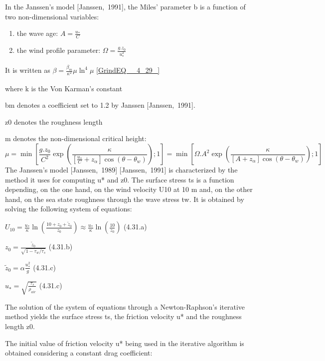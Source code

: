  In the Janssen's model [Janssen,~1991], the Miles' parameter b is a function of two non-dimensional variables:

\begin{enumerate}
\item  the wave age:  $A=\frac{u_{*} }{C} $

\item  the wind profile parameter: $\Omega =\frac{g.z_{0} }{u_{*}^{2} } $
\end{enumerate}

It is written as $\beta =\frac{\beta _{m} }{\kappa _{}^{2} } \mu \ln ^{4} \mu $ \eqref{GrindEQ__4_29_}

 where k is the Von Karman's constant

 bm denotes a coefficient set to 1.2 by Janssen [Janssen,~1991].

 z0 denotes the roughness length

 m denotes the non-dimensional critical height:
\begin{equation} \label{GrindEQ__4_30_}
\mu =\min \left[\frac{g.z_{0} }{C^{2} } \exp \left(\frac{\kappa }{\left[\frac{u_{*} }{C} +z_{\alpha } \right]\cos (\theta -\theta _{w} )} \right);1\right]=\min \left[\Omega .A^{2} \exp \left(\frac{\kappa }{\left[A+z_{\alpha } \right]\cos (\theta -\theta _{w} )} \right);1\right]
\end{equation}
The Janssen's model [Janssen,~1989] [Janssen,~1991] is characterized by the method it uses for computing u* and z0. The surface stress ts is a function depending, on the one hand, on the wind velocity U10 at 10 m and, on the other hand, on the sea state roughness through the wave stress tw. It is obtained by solving the following system of equations:

$U_{10} =\frac{u_{*} }{\kappa } \ln \left(\frac{10+z_{0} +\tilde{z}_{0} }{z_{0} } \right)\approx \frac{u_{*} }{\kappa } \ln \left(\frac{10}{z_{0} } \right)$ (4.31.a)

$z_{0} =\frac{\tilde{z}_{0} }{\sqrt{1-\tau _{w} /\tau _{s} } } $ (4.31.b)

$\tilde{z}_{0} =\alpha \frac{u_{*}^{2} }{g} $ (4.31.c)

$u_{*}^{} =\sqrt{\frac{\tau _{s} }{\rho _{air} } } $ (4.31.c)

 The solution of the system of equations through a Newton-Raphson's iterative method yields the surface stress ts, the friction velocity u* and the roughness length z0.

The initial value of friction velocity u* being used in the iterative algorithm is obtained considering a constant drag coefficient:

